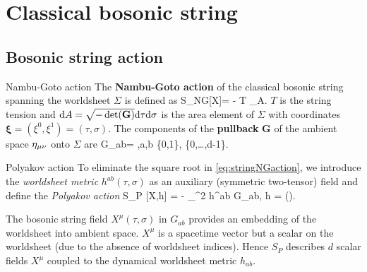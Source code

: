 \section{Classical bosonic string}
\subsection{Bosonic string action}
\begin{mybox}{Nambu-Goto action }
	 The \textbf{Nambu-Goto action} of the classical bosonic string spanning the worldsheet $\Sigma$ is defined as
	\be 
	\label{eq:stringNGaction}
	S_{NG}[X]= - T \int_\Sigma \md A.
	\ee 
	$T$ is the string tension and $\mathrm{d} A=\sqrt{-\det(\mathbf{G})}\mathrm{d} \tau \mathrm{d} \sigma$ is the area element of $\Sigma$ with coordinates $\mathbf{\xi}=(\xi^0,\xi^1)=(\tau,\sigma)$. The components of the \textbf{pullback} $\mathbf{G}$ of the ambient space $\eta_{\mu \nu}$ onto $\Sigma$ are 
	\be 
	\label{eq:stringPullback}
	G_{ab}=  ,\quad  a,b \in \{0,1\}, \; \mu \in \{0,\dots,d-1\}.
	\ee 
	\end{mybox} 
\begin{mybox}{Polyakov action}
	To eliminate the square root in \ref{eq:stringNGaction}, we introduce the \emph{worldsheet metric } $h^{ab}(\tau,\sigma)$ as an auxiliary (symmetric two-tensor) field and define the \emph{Polyakov action} 
	\be 
	\label{eq:stringPaction}
	S_P [X,h] = - \int_\Sigma \md^2 \xi {} h^{ab} G_{ab},\quad {} h = \det().
		\ee 
\end{mybox}
The bosonic string field $X^\mu(\tau,\sigma)$ in $G_{ab}$ provides an embedding of the worldsheet into ambient space. $X^\mu$ is a spacetime vector but a scalar on the worldsheet (due to the absence of worldsheet indices). Hence $S_P$ describes $d$ scalar fields $X^\mu$ coupled to the dynamical worldsheet metric $h_{ab}$. 
